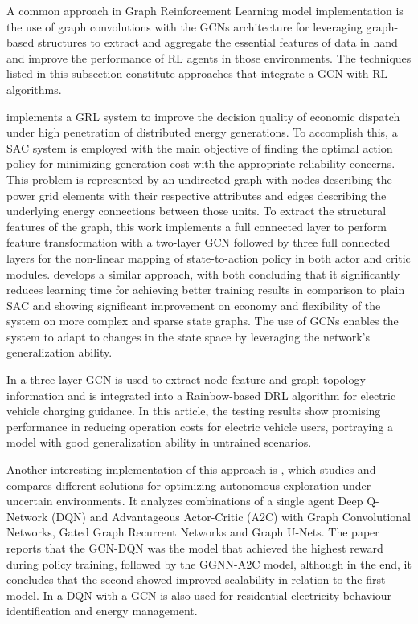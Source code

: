 \documentclass[11pt,a4paper]{article}
\begin{document}
A common approach in Graph Reinforcement Learning model implementation is the use of graph convolutions with the \acp{GCN} architecture for leveraging graph-based structures to extract and aggregate the essential features of data in hand and improve the performance of \ac{RL} agents in those environments. The techniques listed in this subsection constitute approaches that integrate a \ac{GCN} with \ac{RL} algorithms.\par
\cite{liNovelGraphReinforcement2022} implements a \ac{GRL} system to improve the decision quality of economic dispatch under high penetration of distributed energy generations. To accomplish this, a \ac{SAC} system is employed with the main objective of finding the optimal action policy for minimizing generation cost with the appropriate reliability concerns. This problem is represented by an undirected graph with nodes describing the power grid elements with their respective attributes and edges describing the underlying energy connections between those units. To extract the structural features of the graph, this work implements a full connected layer to perform feature transformation with a two-layer \ac{GCN} followed by three full connected layers for the non-linear mapping of state-to-action policy in both actor and critic modules. \cite{chenScalableGraphReinforcement2023} develops a similar approach, with both concluding that it significantly reduces learning time for achieving better training results in comparison to plain \ac{SAC} and showing significant improvement on economy and flexibility of the system on more complex and sparse state graphs. The use of \acp{GCN} enables the system to adapt to changes in the state space by leveraging the network's generalization ability.\par
In \cite{xingGraphReinforcementLearningBased2023} a three-layer \ac{GCN} is used to extract node feature and graph topology information and is integrated into a Rainbow-based \cite{hesselRainbowCombiningImprovements2018} \ac{DRL} algorithm for electric vehicle charging guidance. In this article, the testing results show promising performance in reducing operation costs for electric vehicle users, portraying a model with good generalization ability in untrained scenarios. \par
Another interesting implementation of this approach is \cite{chenAutonomousExplorationUncertainty2020}, which studies and compares different solutions for optimizing autonomous exploration under uncertain environments. It analyzes combinations of a single agent Deep Q-Network (DQN) and Advantageous Actor-Critic (A2C) with Graph Convolutional Networks, Gated Graph Recurrent Networks and Graph U-Nets. The paper reports that the GCN-DQN was the model that achieved the highest reward during policy training, followed by the GGNN-A2C model, although in the end, it concludes that the second showed improved scalability in relation to the first model. In \cite{chenGraphRepresentationLearningbased2023} a DQN with a GCN is also used for residential electricity behaviour identification and energy management.
\end{document}
